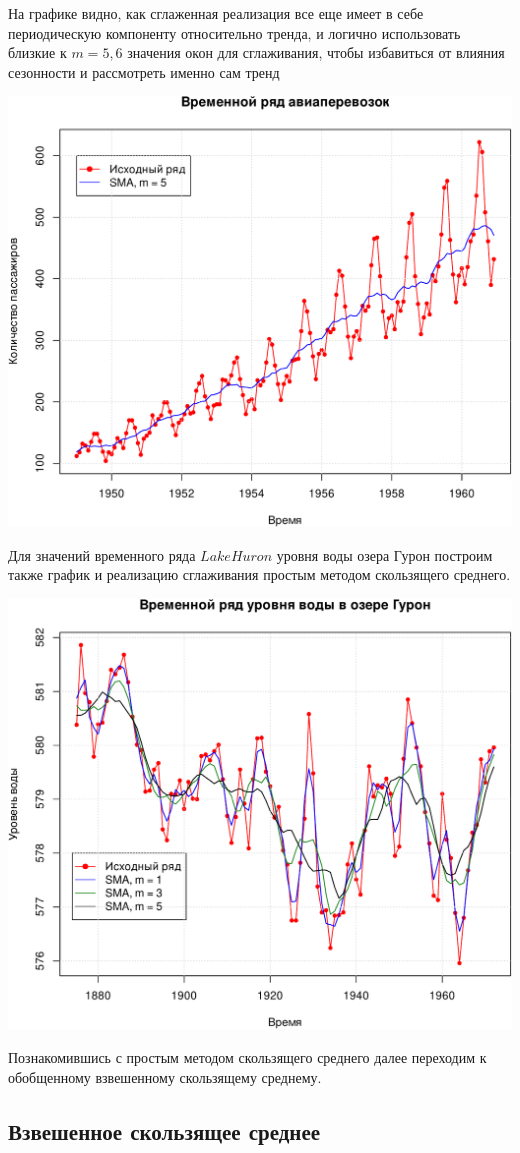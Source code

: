 \documentclass[
]{article}
\begin{document}
На графике видно, как сглаженная реализация все еще имеет в себе
периодическую компоненту относительно тренда, и логично использовать
близкие к \(m = 5, 6\) значения окон для сглаживания, чтобы избавиться
от влияния сезонности и рассмотреть именно сам тренд

\begin{center}\includegraphics[width=0.6\linewidth]{Prac6_files/figure-latex/unnamed-chunk-5-1} \end{center}

Для значений временного ряда \(LakeHuron\) уровня воды озера Гурон
построим также график и реализацию сглаживания простым методом
скользящего среднего.

\begin{center}\includegraphics[width=0.6\linewidth]{Prac6_files/figure-latex/unnamed-chunk-6-1} \end{center}

Познакомившись с простым методом скользящего среднего далее переходим к
обобщенному взвешенному скользящему среднему.

\hypertarget{ux432ux437ux432ux435ux448ux435ux43dux43dux43eux435-ux441ux43aux43eux43bux44cux437ux44fux449ux435ux435-ux441ux440ux435ux434ux43dux435ux435}{%
\subsection{\texorpdfstring{\textbf{Взвешенное скользящее
среднее}}{Взвешенное скользящее среднее}}\label{ux432ux437ux432ux435ux448ux435ux43dux43dux43eux435-ux441ux43aux43eux43bux44cux437ux44fux449ux435ux435-ux441ux440ux435ux434ux43dux435ux435}}
\end{document}
